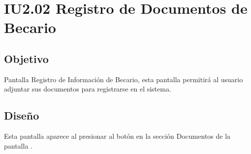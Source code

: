 \newpage
\section{IU2.02 Registro de Documentos de Becario}

\subsection{Objetivo}
	Pantalla Registro de Información de Becario, esta pantalla permitirá al usuario adjuntar sus documentos para registrarse en el sistema.
	


\subsection{Diseño}
	Esta pantalla aparece al presionar al botón %
	 en la sección Documentos de la pantalla .

	
